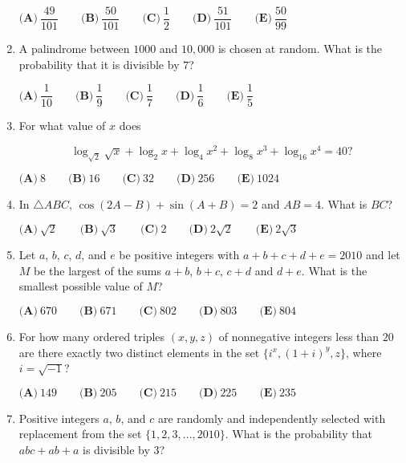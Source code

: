 \documentclass{article}
\begin{document}
\begin{enumerate}[label=\arabic*., itemsep=0.5em]
\(\textbf{(A)}\ \dfrac{49}{101} \qquad \textbf{(B)}\ \dfrac{50}{101} \qquad \textbf{(C)}\ \dfrac{1}{2} \qquad \textbf{(D)}\ \dfrac{51}{101} \qquad \textbf{(E)}\ \dfrac{50}{99}\)\par \vspace{0.5em}\item A palindrome between \(1000\) and \(10,000\) is chosen at random. What is the probability that it is divisible by \(7\)?

\(\textbf{(A)}\ \dfrac{1}{10} \qquad \textbf{(B)}\ \dfrac{1}{9} \qquad \textbf{(C)}\ \dfrac{1}{7} \qquad \textbf{(D)}\ \dfrac{1}{6} \qquad \textbf{(E)}\ \dfrac{1}{5}\)\par \vspace{0.5em}\item For what value of \(x\) does


\begin{equation*}
\log_{\sqrt{2}}\sqrt{x}+\log_{2}{x}+\log_{4}{x^2}+\log_{8}{x^3}+\log_{16}{x^4}=40?
\end{equation*}


\(\textbf{(A)}\ 8 \qquad \textbf{(B)}\ 16 \qquad \textbf{(C)}\ 32 \qquad \textbf{(D)}\ 256 \qquad \textbf{(E)}\ 1024\)\par \vspace{0.5em}\item In \(\triangle ABC\), \(\cos(2A-B)+\sin(A+B)=2\) and \(AB=4\). What is \(BC\)?

\(\textbf{(A)}\ \sqrt{2} \qquad \textbf{(B)}\ \sqrt{3} \qquad \textbf{(C)}\ 2 \qquad \textbf{(D)}\ 2\sqrt{2} \qquad \textbf{(E)}\ 2\sqrt{3}\)\par \vspace{0.5em}\item Let \(a\), \(b\), \(c\), \(d\), and \(e\) be positive integers with \(a+b+c+d+e=2010\) and let \(M\) be the largest of the sums \(a+b\), \(b+c\), \(c+d\) and \(d+e\). What is the smallest possible value of \(M\)?

\(\textbf{(A)}\ 670 \qquad \textbf{(B)}\ 671 \qquad \textbf{(C)}\ 802 \qquad \textbf{(D)}\ 803 \qquad \textbf{(E)}\ 804\)\par \vspace{0.5em}\item For how many ordered triples \((x,y,z)\) of nonnegative integers less than \(20\) are there exactly two distinct elements in the set \(\{i^x, (1+i)^y, z\}\), where \(i=\sqrt{-1}\)?

\(\textbf{(A)}\ 149 \qquad \textbf{(B)}\ 205 \qquad \textbf{(C)}\ 215 \qquad \textbf{(D)}\ 225 \qquad \textbf{(E)}\ 235\)\par \vspace{0.5em}\item Positive integers \(a\), \(b\), and \(c\) are randomly and independently selected with replacement from the set \(\{1, 2, 3,\dots, 2010\}\). What is the probability that \(abc + ab + a\) is divisible by \(3\)?


\end{enumerate}
\end{document}
